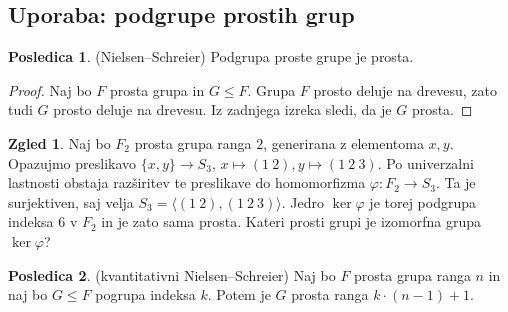 \documentclass[11pt]{book}
\def\vprasanje{\color{oranzna}}
\theoremstyle{definition}
\theoremstyle{zgled}
\newtheorem*{zgled}{Zgled}
\theoremstyle{odprtproblem}
\theoremstyle{domacanaloga}
\newenvironment{dokaz}
    {\color{siva}\begin{proof}}
    {\end{proof}}
\theoremstyle{izrek}
\newtheorem*{posledica}{Posledica}
\begin{document}
\subsection{Uporaba: podgrupe prostih grup}

\begin{posledica}{\sc (Nielsen--Schreier)}
Podgrupa proste grupe je prosta.
\end{posledica}

\begin{dokaz}
Naj bo $F$ prosta grupa in $G \leq F$. Grupa $F$ prosto deluje na drevesu, zato tudi $G$ prosto deluje na drevesu. Iz zadnjega izreka sledi, da je $G$ prosta.
\end{dokaz}

\begin{zgled}
Naj bo $F_2$ prosta grupa ranga $2$, generirana z elementoma $x,y$. Opazujmo preslikavo $\{ x,y \} \to S_3$, $x \mapsto (1 \ 2), y \mapsto (1 \ 2 \ 3)$. Po univerzalni lastnosti obstaja razširitev te preslikave do homomorfizma $\varphi \colon F_2 \to S_3$. Ta je surjektiven, saj velja $S_3 = \langle (1 \ 2), (1 \ 2 \ 3) \rangle$. Jedro $\ker \varphi$ je torej podgrupa indeksa $6$ v $F_2$ in je zato sama prosta. {\vprasanje Kateri prosti grupi je izomorfna grupa $\ker \varphi$?}
\end{zgled}
 
\begin{posledica}{\sc (kvantitativni Nielsen--Schreier)}
Naj bo $F$ prosta grupa ranga $n$ in naj bo $G \leq F$ pogrupa indeksa $k$. Potem je $G$ prosta ranga $k \cdot (n-1) + 1$.
\end{posledica}
\end{document}
